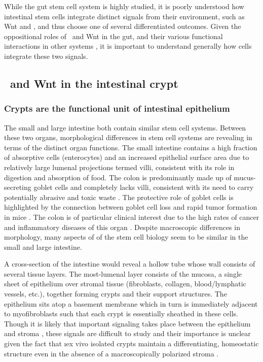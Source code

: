 While the gut stem cell system is highly studied, it is poorly understood
how intestinal stem cells
integrate distinct signals from their environment, such as Wnt and \tgfbsf,
and thus choose one of several differentiated outcomes. Given the oppositional
roles of \tgfbsf\ and Wnt in the gut, and their various functional interactions in other systems
\cite{Attisano2004,Labbe2007,Chong2009,Itasaki2010a,Minoo2010a,
Serra2011,Feigenson2011,Rodriguez-Carballo2011,Chen2012a,Akhmetshina2012,Song2014},
it is important to understand generally how cells integrate these two signals.


\subsection{\tgfbsf\ and Wnt in the intestinal crypt}
\label{pathways:wntTgfb:gut}

\subsubsection{Crypts are the functional unit of intestinal epithelium}

The small and large intestine both contain
similar stem cell systems. Between these two organs, morphological
differences in stem cell systems are revealing in terms of the distinct organ functions.
The small intestine contains a high fraction of absorptive cells (enterocytes)
and an increased epithelial surface area due to relatively large lumenal projections termed
villi, consistent with its role in digestion and absorption of food.
The colon is predominantly made up of mucus-secreting goblet cells
and completely lacks villi, consistent with its need to carry potentially
abrasive and toxic waste \cite{Iacopetta2002}. The protective role of
goblet cells is highlighted by the connection between goblet cell
loss and rapid tumor formation in mice \cite{Yang2008}. The colon is of
particular clinical interest due to the high rates of cancer
and inflammatory diseases of this organ \cite{Jemal2010}. Despite macroscopic differences
in morphology, many aspects of of the stem cell biology seem to be similar
in the small and large intestine.


A cross-section of the intestine would reveal a hollow tube whose wall
consists of several tissue layers. The
most-lumenal layer consists of the mucosa, a single sheet of epithelium
over stromal tissue (fibroblasts, collagen, blood/lymphatic vessels, etc.),
together forming crypts and their support structures.
The epithelium sits atop a basement membrane
\cite{Simon-Assmann2010} which in turn is immediately adjacent to
myofibroblasts such that each crypt is essentially sheathed in these cells.
Though it is likely that important signaling takes place between the
epithelium and stroma \cite{Simon-Assmann2010,Kosinski2010,Ingham2011},
these signals are difficult to study and their importance is unclear given
the fact that \i{ex vivo} isolated crypts maintain a differentiating,
homeostatic structure even in the
absence of a macroscopically polarized stroma \cite{Sato2011a,Lahar2011}.


